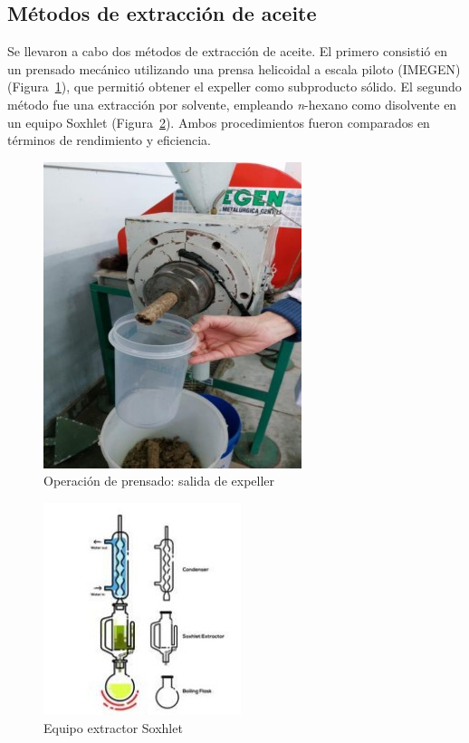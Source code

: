 \documentclass[12pt,a4paper]{article}
\begin{document}
\subsection{Métodos de extracción de aceite}

Se llevaron a cabo dos métodos de extracción de aceite. El primero consistió en un prensado mecánico utilizando una prensa helicoidal a escala piloto (IMEGEN) (Figura~\ref{fig:prensado}), que permitió obtener el expeller como subproducto sólido. El segundo método fue una extracción por solvente, empleando \textit{n}-hexano como disolvente en un equipo Soxhlet (Figura~\ref{fig:soxhlet}). Ambos procedimientos fueron comparados en términos de rendimiento y eficiencia.


\begin{figure}[H]
\centering
\includegraphics{Prensado.jpg}
\caption{Operación de prensado: salida de expeller}
\label{fig:prensado}
\end{figure}

\begin{figure}[H]
\centering
\includegraphics{Soxhlet.jpg}
\caption{Equipo extractor Soxhlet}
\label{fig:soxhlet}
\end{figure}
\end{document}
